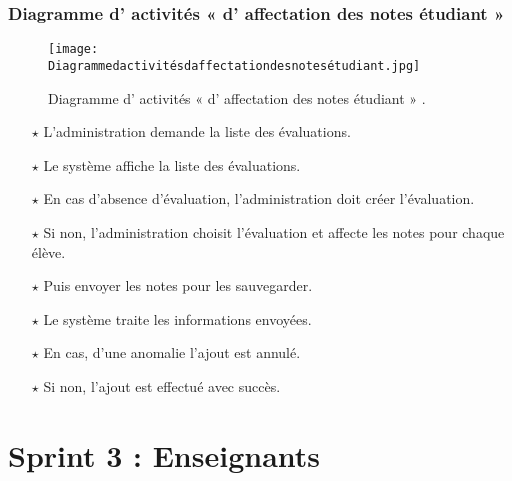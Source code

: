 \subsubsection{Diagramme d' activités « d' affectation des notes étudiant » }
\begin{figure}[ht]
	\centering
	\texttt{[image: Diagrammedactivitésdaffectationdesnotesétudiant.jpg]}
	\caption{Diagramme d' activités « d' affectation des notes étudiant » .}
	\label{fig:Diagramme d' activités  d' affectation des notes étudiant   }
\end{figure}
\FloatBarrier



	\begin{itemize}	
	
	
	
\item[$\star$] L’administration demande la liste des évaluations.
\item[$\star$] Le système affiche la liste des évaluations.
\item[$\star$] En cas d’absence d’évaluation, l’administration doit créer l’évaluation.
\item[$\star$] Si non, l’administration choisit l’évaluation et affecte les notes pour chaque élève.
\item[$\star$] Puis envoyer les notes pour les sauvegarder.
\item[$\star$] Le système traite les informations envoyées.
\item[$\star$] En cas, d’une anomalie l’ajout est annulé.
\item[$\star$] Si non, l’ajout est effectué avec succès.
	
	
	
	
\end{itemize}


















\clearpage
\section{Sprint 3 : Enseignants }
\label{sec:conception}

